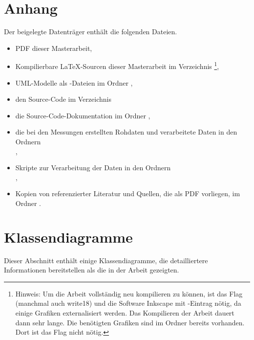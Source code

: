 \appendix
\clearpage
\renewcommand{\sectionmark}[1]{\markboth{\Ifnumbered{section}{Anhang \thesection}{}}{#1}}
\setcounter{page}{1}

\section*{Anhang}
{}

Der beigelegte Datenträger enthält die folgenden Dateien.

\begin{itemize}
	\item PDF dieser Masterarbeit,
	\item Kompilierbare \LaTeX-Sourcen dieser Masterarbeit im Verzeichnis \footnote{Hinweis: Um die Arbeit vollständig neu kompilieren zu können, ist das Flag  (manchmal auch write18) und die Software Inkscape\footnotemark{} mit -Eintrag nötig, da einige Grafiken externalisiert werden. Das Kompilieren der Arbeit dauert dann sehr lange. Die benötigten Grafiken sind im Ordner  bereits vorhanden. Dort ist das Flag nicht nötig.},
	\item UML-Modelle als -Dateien im Ordner ,
	\item den Source-Code im Verzeichnis 
	\item die Source-Code-Dokumentation im Ordner ,
	\item die bei den Messungen erstellten Rohdaten und verarbeitete Daten in den Ordnern\\ ,
	\item Skripte zur Verarbeitung der Daten in den Ordnern\\ ,
	\item Kopien von referenzierter Literatur und Quellen, die als PDF vorliegen, im Ordner .
\end{itemize}


\clearpage
\section{Klassendiagramme}
Dieser Abschnitt enthält einige Klassendiagramme, die detailliertere Informationen bereitstellen als die in der Arbeit gezeigten.
